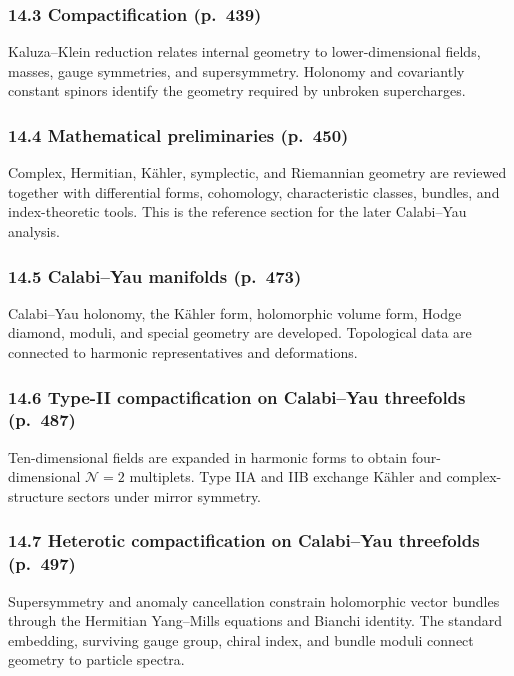 \documentclass[
  10pt,
  a4paper,
  openany]{book}
\begin{document}
\subsubsection{14.3 Compactification
(p.~439)}\label{compactification-p.-439}

Kaluza--Klein reduction relates internal geometry to lower-dimensional
fields, masses, gauge symmetries, and supersymmetry. Holonomy and
covariantly constant spinors identify the geometry required by unbroken
supercharges.

\subsubsection{14.4 Mathematical preliminaries
(p.~450)}\label{mathematical-preliminaries-p.-450}

Complex, Hermitian, Kähler, symplectic, and Riemannian geometry are
reviewed together with differential forms, cohomology, characteristic
classes, bundles, and index-theoretic tools. This is the reference
section for the later Calabi--Yau analysis.

\subsubsection{14.5 Calabi--Yau manifolds
(p.~473)}\label{calabiyau-manifolds-p.-473}

Calabi--Yau holonomy, the Kähler form, holomorphic volume form, Hodge
diamond, moduli, and special geometry are developed. Topological data
are connected to harmonic representatives and deformations.

\subsubsection{14.6 Type-II compactification on Calabi--Yau threefolds
(p.~487)}\label{type-ii-compactification-on-calabiyau-threefolds-p.-487}

Ten-dimensional fields are expanded in harmonic forms to obtain
four-dimensional \(\mathcal N=2\) multiplets. Type IIA and IIB exchange
Kähler and complex-structure sectors under mirror symmetry.

\subsubsection{14.7 Heterotic compactification on Calabi--Yau threefolds
(p.~497)}\label{heterotic-compactification-on-calabiyau-threefolds-p.-497}

Supersymmetry and anomaly cancellation constrain holomorphic vector
bundles through the Hermitian Yang--Mills equations and Bianchi
identity. The standard embedding, surviving gauge group, chiral index,
and bundle moduli connect geometry to particle spectra.
\end{document}
